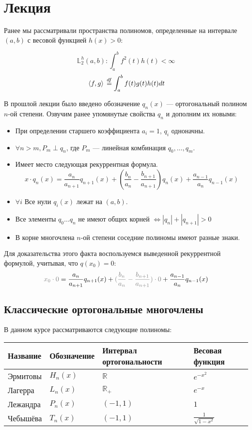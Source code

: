 	\section{Лекция}
	
	Ранее мы рассматривали пространства полиномов, определенные на интервале $(a, b)$ с весовой функцией $h(x) > 0$:
	
	$$\mathbb{L}_2^h (a, b): \int_a^b f^2(t) h(t) < \infty$$
	$$\, \langle f, g \rangle \, \overset{df}{=} \int_a^b f(t) g(t) h(t) dt$$
	
	В прошлой лекции было введено обозначение $q_n(x)$ --- ортогональный полином $n$-ой степени. Озвучим ранее упомянутые
	свойства $q_n$ и дополним их новыми:
	
	\begin{itemize}
		\item При определении старшего коэффициента $a_i = 1$, $q_i$ одноначны.
		\item $\forall n > m, P_m \perp q_n$, где $P_m$ --- линейная комбинация $q_0, \dots , q_m$.
		\item Имеет место следующая рекуррентная формула.
		$$x \cdot q_n(x) = 
		\frac{a_n}{a_{n+1}} q_{n+1}(x) + (\frac{b_n}{a_n} - \frac{b_{n+1}}{a_{n+1}}) q_n(x) + \frac{a_{n-1}}{a_n} q_{n-1}(x)$$
		\item $\forall i$ Все нули $q_i(x)$ лежат на $(a, b)$.
		\item Все элементы $q_0 \dots q_n$ не имеют общих корней $\Leftrightarrow |q_n| + |q_{n+1}| > 0$
		\item В корне многочлена $n$-ой степени соседние полиномы имеют разные знаки.
	\end{itemize}
	
	Для доказательства этого факта воспользуемся выведенной рекуррентной формулой, учитывая, что $q(x_0) = 0$:
	$$ {\color{gray}x_0 \cdot 0} = 
	\frac{a_n}{a_{n+1}} q_{n+1}(x) + {\color{gray}(\frac{b_n}{a_n} - \frac{b_{n+1}}{a_{n+1}}) \cdot 0} + \frac{a_{n-1}}{a_n} q_{n-1}(x)$$
		
	
	\subsection*{Классические ортогональные многочлены}

	В данном курсе рассматриваются следующие полиномы:

	\begin{table}[!th]
		\begin{tabular}{|l|l|l|l|}
			\hline
			Название & Обозначение & Интервал ортогональности & Весовая функция \\
			\hline
			Эрмитовы & $H_n(x)$ & $\mathbb{R}$ & $e^{-x^2}$ \\
			Лагерра  & $L_n(x)$ & $\mathbb{R}_+$ & $e^{-x}$ \\
			Лежандра & $P_n(x)$ & $(-1, 1)$ & $1$ \\
			Чебышёва & $T_n(x)$ & $(-1, 1)$ & $\frac{1}{\sqrt{1-x^2}}$ \\
			\hline
		\end{tabular}
	\end{table}
	
